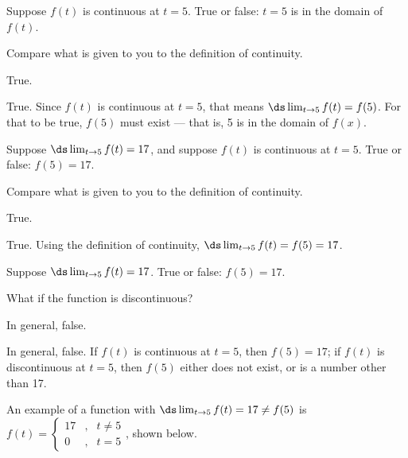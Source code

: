 \begin{question}
Suppose $f(t)$ is continuous at $t=5$. True or false: $t=5$ is in the domain of $f(t)$.
\end{question}
\begin{hint}
Compare what is given to you to the definition of continuity.
\end{hint}
\begin{answer}
True.
\end{answer}
\begin{solution}
True. Since $f(t)$ is continuous at $t=5$, that means $\ds\lim_{t \to 5} f(t)=f(5)$. For that to be true, $f(5)$ must exist --- that is, 5 is in the domain of $f(x)$.
\end{solution}



\begin{question}
Suppose $\ds\lim_{t \rightarrow 5}f(t)=17$, and suppose $f(t)$ is continuous at $t=5$. True or false: $f(5)=17$.
\end{question}
\begin{hint}
Compare what is given to you to the definition of continuity.
\end{hint}
\begin{answer}
True.
\end{answer}
\begin{solution}
True. Using the definition of continuity, $\ds\lim_{t \to 5} f(t)=f(5)=17$.
\end{solution}




\begin{question}
Suppose  $\ds\lim_{t \rightarrow 5}f(t)=17$. True or false: $f(5)=17$.
\end{question}
\begin{hint}
What if the function is discontinuous?
\end{hint}
\begin{answer}
In general, false.
\end{answer}
\begin{solution}
In general, false. If $f(t)$ is continuous at $t=5$, then $f(5)=17$; if $f(t)$ is discontinuous at $t=5$, then $f(5)$ either does not exist, or is a number other than 17.

 An example of a function with $\ds\lim_{t \to 5}f(t)=17 \neq f(5)$ is $f(t)=\left\{
\begin{array}{lcr}
17&,&t \neq 5\\
0&,&t=5
\end{array}
 \right.$, shown below.
 \begin{center}
 \end{center}
\end{solution}



